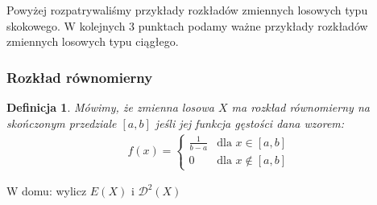 \documentclass[10pt,a4paper]{article}
\newtheorem{definition}{Definicja}[section]
\numberwithin{equation}{subsection}
\begin{document}
Powyżej rozpatrywaliśmy przykłady rozkładów zmiennych losowych typu skokowego. W kolejnych 3 punktach podamy ważne przykłady rozkładów zmiennych losowych typu ciągłego.

\subsubsection{Rozkład równomierny}
\begin{definition}
Mówimy, że zmienna losowa $X$ ma rozkład równomierny na skończonym przedziale $[a,b]$ jeśli jej funkcja gęstości dana wzorem:
\begin{eqnarray}
f(x) = \left\{ \begin{array}{ll}
\frac{1}{b-a} & \textrm{dla $x \in [a,b]$} \\
0 & \textrm{dla $x\notin [a,b]$}
\end{array} \right.
\end{eqnarray}
\end{definition}
W domu: wylicz $E(X)$ i $\mathscr{D}^2(X)$
\end{document}
